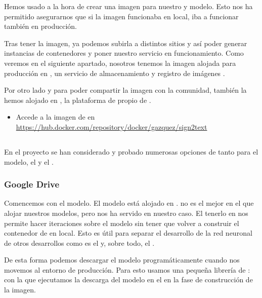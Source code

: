 Hemos usado  a la hora de crear una imagen para nuestro  y modelo. Esto nos ha permitido asegurarnos que si la imagen funcionaba en local, iba a funcionar también en producción.

Tras tener la imagen, ya podemos subirla a distintos sitios y así poder generar instancias de contenedores y poner nuestro servicio en funcionamiento. Como veremos en el siguiente apartado, nosotros tenemos la imagen alojada para producción en , un servicio de almacenamiento y registro de imágenes .

Por otro lado y para poder compartir la imagen con la comunidad, también la hemos alojado en , la plataforma de  propio de .

\begin{itemize}
  \item Accede a la imagen de  en \url{https://hub.docker.com/repository/docker/gazquez/sign2text}
\end{itemize}

\subsection{}

En el proyecto se han considerado y probado numerosas opciones de  tanto para el modelo, el  y el .

\subsubsection{Google Drive}

Comencemos con el modelo. El modelo está alojado en .  no es el mejor  en el que alojar nuestros modelos, pero nos ha servido en nuestro caso. El tenerlo en  nos permite hacer iteraciones sobre el modelo sin tener que volver a construir el contenedor de  en local. Esto es útil para separar el desarrollo de la red neuronal de otros desarrollos como es el  y, sobre todo, el .

De esta forma podemos descargar el modelo programáticamente cuando nos movemos al entorno de producción. Para esto usamos una pequeña librería de :  con la que ejecutamos la descarga del modelo en el  en la fase de construcción de la imagen.

